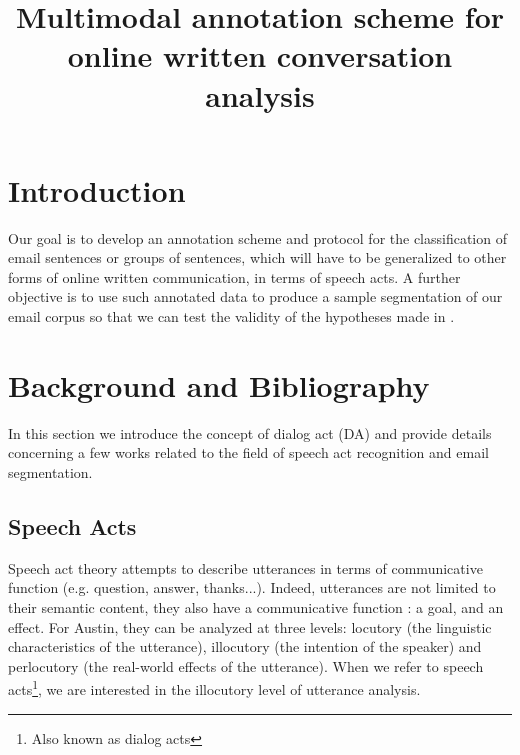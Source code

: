 \documentclass[11pt]{article}
\begin{document}
\title{Multimodal annotation scheme for online written conversation analysis}

\begin{titlepage}

\maketitle

\tableofcontents

\end{titlepage}

\section{Introduction}

Our goal is to develop an annotation scheme and protocol for the classification of email sentences or groups of sentences, which will have to be generalized to other forms of online written communication, in terms of speech acts. A further objective is to use such annotated data to produce a sample segmentation of our email corpus so that we can test the validity of the hypotheses made in \cite{hernandez2014exploiting}.


\section{Background and Bibliography}

In this section we introduce the concept of dialog act (DA) and provide details concerning a few works related to the field of speech act recognition and email segmentation.

\subsection{Speech Acts}

Speech act theory \cite{austin1975things} attempts to describe utterances in terms of communicative function (e.g. question, answer, thanks...). Indeed, utterances are not limited to their semantic content, they also have a communicative function : a goal, and an effect. For Austin, they can be analyzed at three levels: locutory (the linguistic characteristics of the utterance), illocutory (the intention of the speaker) and perlocutory (the real-world effects of the utterance). When we refer to speech acts\footnote{Also known as dialog acts}, we are interested in the illocutory level of utterance analysis. 
\end{document}
